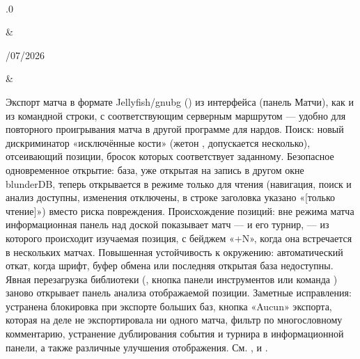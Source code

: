 \documentclass[letterpaper,10pt,russian]{sphinxmanual}
\begin{document}
\begin{savenotes}
\begin{longtable}{}
\begin{varwidth}[t]{}
\sphinxbeforeendvarwidth
\end{varwidth}%
\\
\sphinxhline\begin{varwidth}[t]{}
.0
\sphinxbeforeendvarwidth
\end{varwidth}%
&\begin{varwidth}[t]{}
/07/2026
\sphinxbeforeendvarwidth
\end{varwidth}%
&\begin{varwidth}[t]{}
\sphinxAtStartPar
Экспорт матча в формате Jellyfish/gnubg () из интерфейса (панель Матчи), как и из командной строки, с соответствующим серверным маршрутом — удобно для повторного проигрывания матча в другой программе для нардов. Поиск: новый дискриминатор «исключённые кости» (жетон , допускается несколько), отсеивающий позиции, бросок которых соответствует заданному. Безопасное одновременное открытие: база, уже открытая на запись в другом окне blunderDB, теперь открывается в режиме только для чтения (навигация, поиск и анализ доступны, изменения отключены, в строке заголовка указано «{[}только чтение{]}») вместо риска повреждения. Происхождение позиций: вне режима матча информационная панель над доской показывает матч — и его турнир, — из которого происходит изучаемая позиция, с бейджем «+N», когда она встречается в нескольких матчах. Повышенная устойчивость к окружению: автоматический откат, когда шрифт, буфер обмена или последняя открытая база недоступны. Явная перезагрузка библиотеки (, кнопка панели инструментов или команда ) заново открывает панель анализа отображаемой позиции. Заметные исправления: устранена блокировка при экспорте больших баз, кнопка «Aucun» экспорта, которая на деле не экспортировала ни одного матча, фильтр по многословному комментарию, устранение дублирования события и турнира в информационной панели, а также различные улучшения отображения. См. {\hyperref[\detokenize{cmd_mode:cmd-mode}]{}}, {\hyperref[\detokenize{manuel:panneau-matchs}]{}} и {\hyperref[\detokenize{manuel:manuel}]{}}.
\sphinxbeforeendvarwidth
\end{varwidth}%
\\
\sphinxhline\begin{varwidth}[t]{}

\end{varwidth}
\end{longtable}
\end{savenotes}
\end{document}
